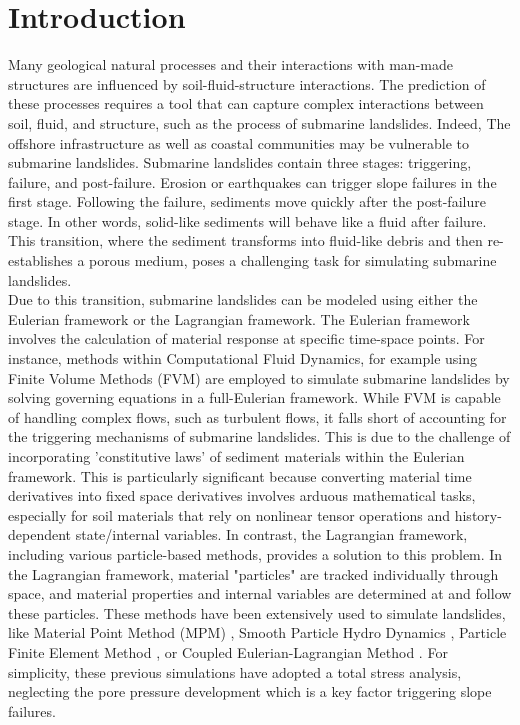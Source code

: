\documentclass[preprint,12pt]{elsarticle}
\begin{document}
\newpage
%
\section{\textsf{Introduction}}

 Many geological natural processes and their interactions with man-made structures are influenced by soil-fluid-structure interactions. The prediction of these processes requires a tool that can capture complex interactions between soil, fluid, and structure, such as the process of submarine landslides. Indeed, The offshore infrastructure as well as coastal communities may be vulnerable to submarine landslides. Submarine landslides contain three stages: triggering, failure, and post-failure. Erosion or earthquakes can trigger slope failures in the first stage. Following the failure, sediments move quickly after the post-failure stage. In other words, solid-like sediments will behave like a fluid after failure. This transition, where the sediment transforms into fluid-like debris and then re-establishes a porous medium, poses a challenging task for simulating submarine landslides.\\
Due to this transition, submarine landslides can be modeled using either the Eulerian framework or the Lagrangian framework. The Eulerian framework involves the calculation of material response at specific time-space points. For instance, methods within Computational Fluid Dynamics, for example using Finite Volume Methods (FVM) are employed to simulate submarine landslides \cite{CFD1, CFD2,CFD3, CFD4}  by solving governing equations in a full-Eulerian framework. While FVM is capable of handling complex flows, such as turbulent flows, it falls short of accounting for the triggering mechanisms of submarine landslides. This is due to the challenge of incorporating 'constitutive laws' of sediment materials within the Eulerian framework. This is particularly significant because converting material time derivatives into fixed space derivatives involves arduous mathematical tasks, especially for soil materials that rely on nonlinear tensor operations and history-dependent state/internal variables. In contrast, the Lagrangian framework, including various particle-based methods, provides a solution to this problem. In the Lagrangian framework, material "particles" are tracked individually through space, and material properties and internal variables are determined at and follow these particles. These methods have been extensively used to simulate landslides, like Material Point Method (MPM) \cite{Tran2019}, Smooth Particle Hydro Dynamics \cite{Capone2010}, Particle Finite Element Method \cite{Zhang2019}, or Coupled Eulerian-Lagrangian Method \cite{Dey2016}. For simplicity, these previous simulations have adopted a total stress analysis, neglecting the pore pressure development which is a key factor triggering slope failures. \\
\end{document}

